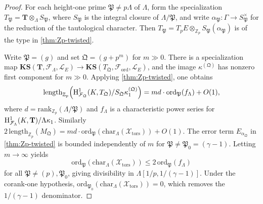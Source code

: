 \begin{proof}
  For each height-one prime \(\mathfrak{P} \neq p\Lambda\) of \(\Lambda\), form the specialization \(T_{\mathfrak{P}} = \mathbf{T} \otimes_\Lambda S_{\mathfrak{P}}\), where \(S_{\mathfrak{P}}\) is the integral closure of \(\Lambda/\mathfrak{P}\), and write \(\alpha_{\mathfrak{P}} : \Gamma \to S_{\mathfrak{P}}^\times\) for the reduction of the tautological character. Then \(T_{\mathfrak{P}} = T_p E \otimes_{\mathbb{Z}_p} S_{\mathfrak{P}}(\alpha_{\mathfrak{P}})\) is of the type in \cref{thm:Zp-twisted}.

  Write \(\mathfrak{P} = (g)\) and set \(\mathfrak{Q} = (g + p^m)\) for \(m \gg 0\). There is a specialization map \(\mathbf{KS}(\mathbf{T}, \mathcal{F}_\Lambda, \mathcal{L}_E) \to \mathbf{KS}(T_{\mathfrak{Q}}, \mathcal{F}_{\mathrm{ord}}, \mathcal{L}_E)\), and the image \(\kappa^{(\mathfrak{Q})}\) has nonzero first component for \(m \gg 0\). Applying \cref{thm:Zp-twisted}, one obtains
  \[
    \mathrm{length}_{\mathbb{Z}_p}\!\left(\mathrm{H}^1_{\mathcal{F}_{\mathfrak{Q}}}(K, T_{\mathfrak{Q}})/S_{\mathfrak{Q}}\kappa_1^{(\mathfrak{Q})}\right) = md \cdot \mathrm{ord}_{\mathfrak{P}}(f_\Lambda) + O(1),
  \]
  where \(d = \mathrm{rank}_{\mathbb{Z}_p}(\Lambda/\mathfrak{P})\) and \(f_\Lambda\) is a characteristic power series for \(\mathrm{H}^1_{\mathcal{F}_\Lambda}(K, \mathbf{T})/\Lambda\kappa_1\). Similarly \(2\,\mathrm{length}_{\mathbb{Z}_p}(M_{\mathfrak{Q}}) = md \cdot \mathrm{ord}_{\mathfrak{P}}(\mathrm{char}_\Lambda(\mathcal{X}_{\mathrm{tors}})) + O(1)\). The error term \(E_{\alpha_{\mathfrak{Q}}}\) in \cref{thm:Zp-twisted} is bounded independently of \(m\) for \(\mathfrak{P} \neq \mathfrak{P}_0 = (\gamma-1)\). Letting \(m \to \infty\) yields
  \[
    \mathrm{ord}_{\mathfrak{P}}\!\left(\mathrm{char}_\Lambda(\mathcal{X}_{\mathrm{tors}})\right) \leq 2\,\mathrm{ord}_{\mathfrak{P}}(f_\Lambda)
  \]
  for all \(\mathfrak{P} \neq (p), \mathfrak{P}_0\), giving divisibility in \(\Lambda[1/p, 1/(\gamma-1)]\). Under the corank-one hypothesis, \(\mathrm{ord}_{\mathfrak{P}_0}(\mathrm{char}_\Lambda(\mathcal{X}_{\mathrm{tors}})) = 0\), which removes the \(1/(\gamma-1)\) denominator.
\end{proof}

